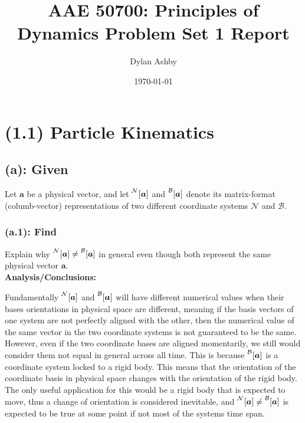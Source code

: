 \documentclass[titlepage]{article}
\title{AAE 50700: Principles of Dynamics Problem Set 1 Report}
\author{Dylan Ashby}
\date{\today}
\begin{document}
\maketitle

\section*{(1.1) Particle Kinematics}

\subsection*{(a): Given} 
Let $\boldsymbol{a}$ be a physical vector, and let $\prescript{\mathcal{N}}{}{[\boldsymbol{a}]}$ and $\prescript{\mathcal{B}}{}{[\boldsymbol{a}]}$ denote its matrix-format (columb-vector) representations of two different coordinate systems $\mathcal{N}$ and $\mathcal{B}$.

\subsubsection*{(a.1): Find}
Explain why $\prescript{\mathcal{N}}{}{[\boldsymbol{a}]}\ne \prescript{\mathcal{B}}{}{[\boldsymbol{a}]}$ in general even though both represent the same physical vector $\boldsymbol{a}$.\\

\textbf{Analysis/Conclusions:}
\begin{mdframed}[linewidth=1pt, innertopmargin=10pt, innerbottommargin=10pt]
Fundamentally $\prescript{\mathcal{N}}{}{[\boldsymbol{a}]}$ and $\prescript{\mathcal{B}}{}{[\boldsymbol{a}]}$ will have different numerical values when their bases orientations in physical space are different, meaning if the basis vectors of one system are not perfectly aligned with the other, then the numerical value of the same vector in the two coordinate systems is not guaranteed to be the same.\\

However, even if the two coordinate bases are aligned momentarily, we still would consider them not equal in general across all time. This is because $\prescript{\mathcal{B}}{}{[\boldsymbol{a}]}$ is a coordinate system locked to a rigid body. This means that the orientation of the coordinate basis in physical space changes with the orientation of the rigid body. The only useful application for this would be a rigid body that is expected to move, thus a change of orientation is considered inevitable, and $\prescript{\mathcal{N}}{}{[\boldsymbol{a}]}\ne \prescript{\mathcal{B}}{}{[\boldsymbol{a}]}$ is expected to be true at some point if not most of the systems time span.
\end{mdframed}
\end{document}
